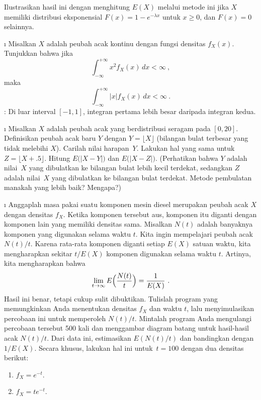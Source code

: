 {\begin{LJSItem}
Ilustrasikan hasil ini dengan menghitung $E(X)$ melalui metode ini jika $X$ memiliki
distribusi eksponensial $F(x) = 1 - e^{-\lambda x}$ untuk $x \geq 0$, dan $F(x) = 0$
selainnya.

\i\label{exer 6.3.15.5} Misalkan $X$ adalah peubah acak kontinu dengan fungsi
densitas $f_X(x)$. Tunjukkan bahwa jika
$$
\int_{-\infty}^{+\infty} x^2 f_X(x)\, dx < \infty\ ,
$$ maka
$$
\int_{-\infty}^{+\infty} |x| f_X(x)\, dx < \infty\ .
$$ 
 : Di luar interval $[-1, 1]$, integran pertama lebih besar daripada
integran kedua.

\i\label{exer 6.3.16} Misalkan $X$ adalah peubah acak yang berdistribusi seragam pada
$[0,20]$. Definisikan peubah acak baru $Y$ dengan $Y = \lfloor X\rfloor$ (bilangan
bulat terbesar yang tidak melebihi $X$). Carilah nilai harapan~$Y$. Lakukan hal yang sama untuk $Z =
\lfloor X + .5\rfloor$. Hitung $E\bigl(|X-Y|\bigr)$ dan $E\bigl(|X-Z|\bigr)$.
(Perhatikan bahwa $Y$ adalah nilai~$X$ yang dibulatkan ke bilangan bulat lebih kecil
terdekat, sedangkan $Z$ adalah nilai~$X$ yang dibulatkan ke bilangan bulat terdekat.
Metode pembulatan manakah yang lebih baik? Mengapa?)

\i\label{exer 6.3.17} Anggaplah masa pakai suatu komponen mesin diesel merupakan
peubah acak $X$ dengan densitas $f_X$. Ketika komponen tersebut aus, komponen itu
diganti dengan komponen lain yang memiliki densitas sama. Misalkan $N(t)$ adalah
banyaknya komponen yang digunakan selama waktu $t$. Kita ingin mempelajari peubah acak
$N(t)/t$. Karena rata-rata komponen diganti setiap $E(X)$ satuan waktu, kita
mengharapkan sekitar $t/E(X)$ komponen digunakan selama waktu $t$. Artinya, kita
mengharapkan bahwa
$$
\lim_{t \to \infty} E \Bigl(\frac {N(t)}t\Bigr) = \frac 1{E(X)}\ .
$$ Hasil ini benar, tetapi cukup sulit dibuktikan. Tulislah program yang memungkinkan
Anda menentukan densitas $f_X$ dan waktu $t$, lalu menyimulasikan percobaan ini untuk
memperoleh $N(t)/t$. Mintalah program Anda mengulangi percobaan tersebut 500 kali dan
menggambar diagram batang untuk hasil-hasil acak $N(t)/t$. Dari data ini, estimasikan
$E(N(t)/t)$ dan bandingkan dengan $1/E(X)$. Secara khusus, lakukan hal ini untuk~$t =
100$ dengan dua densitas berikut:

\begin{enumerate}
\item $f_X = e^{-t}$.

\item $f_X = te^{-t}$.
\end{enumerate}


\end{LJSItem}}
